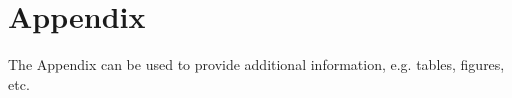 \section{Appendix}\label{sec:Appendix}

The Appendix can be used to provide additional information, e.g. tables, figures, etc.


